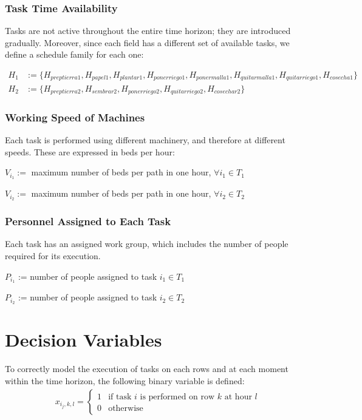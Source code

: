 \subsubsection{Task Time Availability}

Tasks are not active throughout the entire time horizon; they are introduced gradually.  
Moreover, since each field has a different set of available tasks, we define a schedule family for each one:

\[\begin{aligned}
    H_1 &:= \{H_{preptierra1},H_{papel1},H_{plantar1},H_{ponerriego1},H_{ponermalla1},H_{quitarmalla1},H_{quitarriego1},H_{cosecha1}\}\\
    H_2 &:= \{H_{preptierra2},H_{sembrar2},H_{ponerriego2},H_{quitarriego2},H_{cosechar2}\}   
\end{aligned}\]    

\subsubsection{Working Speed of Machines}

Each task is performed using different machinery, and therefore at different speeds. These are expressed in beds per hour:
\begin{center}
$V_{i_1} :=$ maximum number of beds per path in one hour, $\forall i_1 \in T_1$

$V_{i_2} :=$ maximum number of beds per path in one hour, $\forall i_2 \in T_2$
\end{center}




\subsubsection{Personnel Assigned to Each Task}

Each task has an assigned work group, which includes the number of people required for its execution.
\begin{center}
    $P_{i_1}$ := number of people assigned to task $i_1 \in T_1$

    $P_{i_2}$ := number of people assigned to task $i_2 \in T_2$    
\end{center}


\section*{Decision Variables}
To correctly model the execution of tasks on each rows and at each moment within the time horizon, the following binary variable is defined:
\[
\begin{aligned}
    x_{i_j,k,l} = 
    \begin{cases} 
        1 & \text{if task } i \text{ is performed on row } k \text{ at hour } l \\
        0 & \text{otherwise}
    \end{cases}
\end{aligned}
\]

